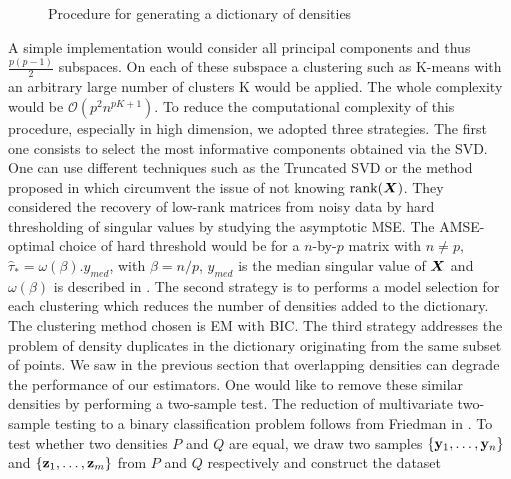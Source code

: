 \begin{figure}[ht]
\begin{center}
   \caption{Procedure for generating a dictionary of densities}
   \label{algo:dictionary_generator}
\end{center}
\end{figure}
A simple implementation would consider all principal components and thus $\frac{p(p-1)}{2}$ subspaces. On each of these subspace a clustering such as K-means with an arbitrary large number of clusters K would be applied. The whole complexity would be $\mathcal{O}(p^2n^{pK+1})$. To reduce the computational complexity of this procedure, especially in high dimension, we adopted three strategies. The first one consists to select the most informative components obtained via the SVD. One can use different techniques such as the Truncated SVD or the method proposed in \citep{Gavish2014} which circumvent the issue of not knowing $\textnormal{rank}(\boldsymbol X)$. They considered the recovery of low-rank matrices from noisy data by hard thresholding of singular values by studying the asymptotic MSE. The AMSE-optimal choice of hard threshold would be for a $n$-by-$p$ matrix with $n\neq p$, $\hat\tau_* = \omega(\beta).y_{med}$, with $\beta = n/p$, $y_{med}$ is the median singular value of $\boldsymbol X$ and $\omega(\beta)$ is described in \citep{Gavish2014}. The second strategy is to performs a model selection for each clustering which reduces the number of densities added to the dictionary. The clustering method chosen is EM with BIC. The third strategy addresses the problem of density duplicates in the dictionary originating from the same subset of points. We saw in the previous section that overlapping densities can degrade the performance of our estimators. One would like to remove these similar densities by performing a two-sample test. The reduction of multivariate two-sample testing to a binary classification problem follows from Friedman in \citep{Friedman:2003id}. To test whether two densities $P$ and $Q$ are equal, we draw two samples $\{\mathbf y_1,\dots,\mathbf y_n\}$ and $\{\mathbf z_1,\dots,\mathbf z_m\}$ from $P$ and $Q$ respectively and construct the dataset
